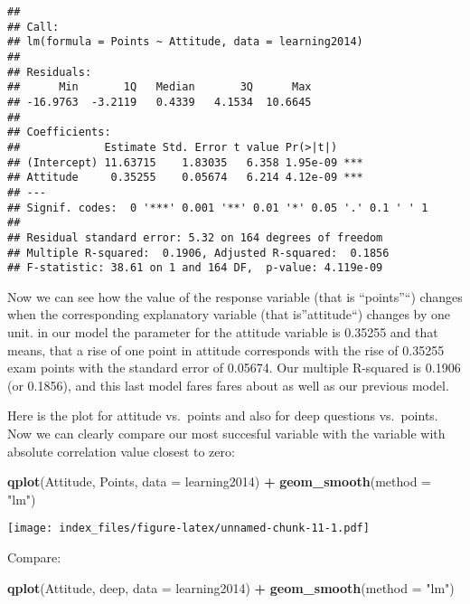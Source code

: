 \documentclass[]{article}
\newenvironment{Shaded}{\begin{snugshade}}{\end{snugshade}}
\newcommand{\KeywordTok}[1]{\textcolor[rgb]{0.13,0.29,0.53}{\textbf{#1}}}
\newcommand{\DataTypeTok}[1]{\textcolor[rgb]{0.13,0.29,0.53}{#1}}
\newcommand{\StringTok}[1]{\textcolor[rgb]{0.31,0.60,0.02}{#1}}
\newcommand{\OperatorTok}[1]{\textcolor[rgb]{0.81,0.36,0.00}{\textbf{#1}}}
\newcommand{\NormalTok}[1]{#1}
\begin{document}
\begin{verbatim}
## 
## Call:
## lm(formula = Points ~ Attitude, data = learning2014)
## 
## Residuals:
##      Min       1Q   Median       3Q      Max 
## -16.9763  -3.2119   0.4339   4.1534  10.6645 
## 
## Coefficients:
##             Estimate Std. Error t value Pr(>|t|)    
## (Intercept) 11.63715    1.83035   6.358 1.95e-09 ***
## Attitude     0.35255    0.05674   6.214 4.12e-09 ***
## ---
## Signif. codes:  0 '***' 0.001 '**' 0.01 '*' 0.05 '.' 0.1 ' ' 1
## 
## Residual standard error: 5.32 on 164 degrees of freedom
## Multiple R-squared:  0.1906, Adjusted R-squared:  0.1856 
## F-statistic: 38.61 on 1 and 164 DF,  p-value: 4.119e-09
\end{verbatim}

Now we can see how the value of the response variable (that is
``points''``) changes when the corresponding explanatory variable (that
is''attitude``) changes by one unit. in our model the parameter for the
attitude variable is 0.35255 and that means, that a rise of one point in
attitude corresponds with the rise of 0.35255 exam points with the
standard error of 0.05674. Our multiple R-squared is 0.1906 (or 0.1856),
and this last model fares fares about as well as our previous model.

Here is the plot for attitude vs.~points and also for deep questions
vs.~points. Now we can clearly compare our most succesful variable with
the variable with absolute correlation value closest to zero:

\begin{Shaded}
\begin{Highlighting}[]
\KeywordTok{qplot}\NormalTok{(Attitude, Points, }\DataTypeTok{data =}\NormalTok{ learning2014) }\OperatorTok{+}\StringTok{ }\KeywordTok{geom_smooth}\NormalTok{(}\DataTypeTok{method =} \StringTok{"lm"}\NormalTok{)}
\end{Highlighting}
\end{Shaded}

\texttt{[image: index\_files/figure-latex/unnamed-chunk-11-1.pdf]}

Compare:

\begin{Shaded}
\begin{Highlighting}[]
\KeywordTok{qplot}\NormalTok{(Attitude, deep, }\DataTypeTok{data =}\NormalTok{ learning2014) }\OperatorTok{+}\StringTok{ }\KeywordTok{geom_smooth}\NormalTok{(}\DataTypeTok{method =} \StringTok{"lm"}\NormalTok{)}
\end{Highlighting}
\end{Shaded}
\end{document}
